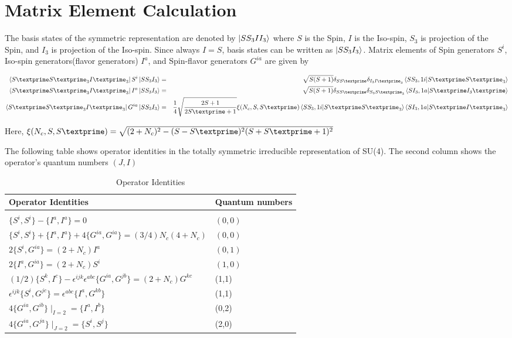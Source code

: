 \documentclass{article}
\newcommand{\bea}{\begin{eqnarray}}
\newcommand{\eea}{\end{eqnarray}}
\newcommand{\pr}{\textprime}
\begin{document}
\newpage





\section{Matrix Element Calculation}


The basis states of the symmetric representation are denoted by $\ket{S S_3 I  I_3} $ where $S$ is the Spin, $I$ is the Iso-spin, $S_3$ is  projection of the Spin, and $I_3$ is projection of the Iso-spin. Since always $I=S$, basis states can be written as $\ket{S S_3  I_3} $. 
\newline
Matrix elements of Spin generators $S^i$, Iso-spin generators(flavor generators) $I^a$, and Spin-flavor generators $G^{ia}$ are given by \cite{Cordon2013}


\bea 
\bra{S\pr S\pr_3 I\pr_3} S^i \ket{S S_3 I_3} =&& \sqrt{S(S+1)}  \delta_{SS\pr} \delta_{I_3I\pr_3}\bra{S S_3, 1 i} \ket{S\pr S\pr_3} \nonumber \\
\bra{S\pr S\pr_3 I\pr_3} I^a \ket{S S_3 I_3} =&& \sqrt{S(S+1)}  \delta_{SS\pr} \delta_{S_3S\pr_3}\bra{S I_3, 1 a} \ket{S\pr I_3\pr} \\
\bra{S\pr S\pr_3 I\pr_3} G^{ia} \ket{S S_3 I_3} =&& \frac{1}{4}\sqrt{\frac{2S+1}{2S\pr+1}} \xi(N_c,S,S\pr)  \bra{S S_3, 1 i} \ket{S\pr S\pr_3}  \bra{S I_3, 1 a} \ket{S\pr I\pr_3} \nonumber
\eea

Here, $ \xi(N_c,S,S\pr)= \sqrt{(2+N_c)^2-(S-S\pr)^2(S+S\pr+1)^2}$

The following table shows operator identities in the totally symmetric irreducible representation of SU(4). The second column shows the operator’s quantum numbers $(J,I)$ \cite{Cordon2013}

\begin{table}
	[ht] 
	\centering
	\caption{Operator Identities}\label{table:Operator_Identities}
	\begin{tabular}{  M{8cm} M{3cm}}
		\hline 
		 Operator Identities & Quantum numbers\\
		\hline   
		\\                         		
		$\{S^i,S^i\}-\{I^a,I^a\}= 0 $&		$ (0,0)$  \\ 
		$\{S^i,S^i\}+ \{I^a,I^a\} +4\{G^{ia},G^{ia}\}= (3/4) N_c(4+N_c)$ &		$(0,0)$ \\ 
		$2 \{ S^i,G^{ia}\}= (2+N_c)I^a$& $(0,1) $		\\
		$2 \{ I^a,G^{ia}\}= (2+N_c)S^i$& $(1,0) $		\\
		$(1/2)\{S^k,I^c\} -\epsilon^{ijk} \epsilon^{abc} \{G^{ia},G^{jb}\} =(2+N_c)G^{kc}$&	(1,1)	\\
		$\epsilon^{ijk} \{S^i,G^{jc}\} = \epsilon^{abc} \{I^a,G^{kb}\} $&	(1,1)\\
		$4\{G^{ia},G^{ib}\} \mid _{I=2} = \{I^a,I^b\}$&	(0,2)\\
		$4\{G^{ia},G^{ja}\} \mid _{J=2} = \{S^i,S^j\}$&	(2,0)\\
		\hline
	\end{tabular}
\end{table}
\end{document}
